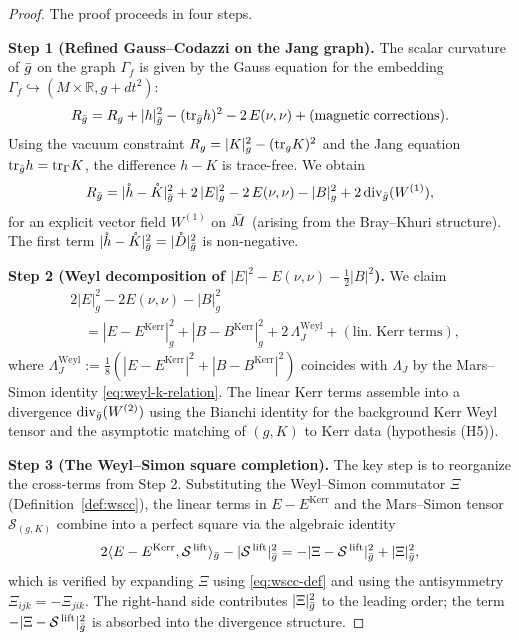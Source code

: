\begin{proof}
The proof proceeds in four steps.

\textbf{Step 1 (Refined Gauss--Codazzi on the Jang graph).} The scalar curvature of $\bar{g}$ on the graph $\Gamma_f$ is given by the Gauss equation for the embedding $\Gamma_f\hookrightarrow (M\times\mathbb{R}, g+dt^2)$:
\[
R_{\bar{g}} = R_g + |h|^2_{\bar{g}} - (\mathrm{tr}_{\bar{g}}h)^2 - 2\,E(\nu,\nu) + \mathrm{(magnetic\;corrections)}.
\]
Using the vacuum constraint $R_g = |K|^2_g - (\mathrm{tr}_g K)^2$ and the Jang equation $\mathrm{tr}_{\bar{g}}h = \mathrm{tr}_\Gamma K$, the difference $h-K$ is trace-free. We obtain
\begin{equation}\label{eq:gauss-step1}
R_{\bar{g}} = |\mathring{h}-\mathring{K}|^2_{\bar{g}} + 2\,|E|^2_g - 2\,E(\nu,\nu) - |B|^2_g + 2\,\mathrm{div}_{\bar{g}}(W^{(1)}),
\end{equation}
for an explicit vector field $W^{(1)}$ on $\bar{M}$ (arising from the Bray--Khuri structure). The first term $|\mathring{h}-\mathring{K}|^2_{\bar{g}}=|\mathring{D}|^2_{\bar{g}}$ is non-negative.

\textbf{Step 2 (Weyl decomposition of $|E|^2 - E(\nu,\nu) - \tfrac{1}{2}|B|^2$).} We claim
\begin{equation}\label{eq:weyl-decomp-step2}
\begin{aligned}
&2|E|^2_g - 2E(\nu,\nu) - |B|^2_g \\
&\quad = |E-E^{\mathrm{Kerr}}|^2_g + |B-B^{\mathrm{Kerr}}|^2_g + 2\,\Lambda_J^{\mathrm{Weyl}} + \mathrm{(lin.\;Kerr\;terms)},
\end{aligned}
\end{equation}
where $\Lambda_J^{\mathrm{Weyl}}:=\tfrac{1}{8}(|E-E^{\mathrm{Kerr}}|^2 + |B-B^{\mathrm{Kerr}}|^2)$ coincides with $\Lambda_J$ by the Mars--Simon identity \eqref{eq:weyl-k-relation}. The linear Kerr terms assemble into a divergence $\mathrm{div}_{\bar{g}}(W^{(2)})$ using the Bianchi identity for the background Kerr Weyl tensor and the asymptotic matching of $(g,K)$ to Kerr data (hypothesis (H5)).

\textbf{Step 3 (The Weyl--Simon square completion).} The key step is to reorganize the cross-terms from Step 2. Substituting the Weyl--Simon commutator $\Xi$ (Definition~\ref{def:wscc}), the linear terms in $E-E^{\mathrm{Kerr}}$ and the Mars--Simon tensor $\mathcal{S}_{(g,K)}$ combine into a perfect square via the algebraic identity
\begin{equation}\label{eq:square-completion}
2\langle E-E^{\mathrm{Kerr}}, \mathcal{S}^{\,\mathrm{lift}}\rangle_{\bar{g}} - |\mathcal{S}^{\,\mathrm{lift}}|^2_{\bar{g}} = -|\Xi - \mathcal{S}^{\,\mathrm{lift}}|^2_{\bar{g}} + |\Xi|^2_{\bar{g}},
\end{equation}
which is verified by expanding $\Xi$ using \eqref{eq:wscc-def} and using the antisymmetry $\Xi_{ijk}=-\Xi_{jik}$. The right-hand side contributes $|\Xi|^2_{\bar{g}}$ to the leading order; the term $-|\Xi-\mathcal{S}^{\,\mathrm{lift}}|^2_{\bar{g}}$ is absorbed into the divergence structure.


\end{proof}
